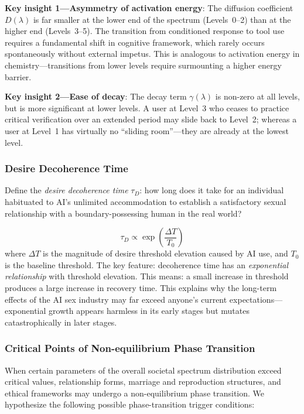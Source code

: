 ﻿\documentclass[12pt,a4paper]{article}
\begin{document}
\textbf{Key insight 1---Asymmetry of activation energy}: The diffusion coefficient $D(\lambda)$ is far smaller at the lower end of the spectrum (Levels~0--2) than at the higher end (Levels~3--5). The transition from conditioned response to tool use requires a fundamental shift in cognitive framework, which rarely occurs spontaneously without external impetus. This is analogous to activation energy in chemistry---transitions from lower levels require surmounting a higher energy barrier.

\textbf{Key insight 2---Ease of decay}: The decay term $\gamma(\lambda)$ is non-zero at all levels, but is more significant at lower levels. A user at Level~3 who ceases to practice critical verification over an extended period may slide back to Level~2; whereas a user at Level~1 has virtually no ``sliding room''---they are already at the lowest level.

\subsubsection{Desire Decoherence Time}

Define the \emph{desire decoherence time} $\tau_D$: how long does it take for an individual habituated to AI's unlimited accommodation to establish a satisfactory sexual relationship with a boundary-possessing human in the real world?

\begin{equation}
\tau_D \propto \exp\left(\frac{\Delta T}{T_0}\right)
\end{equation}
where $\Delta T$ is the magnitude of desire threshold elevation caused by AI use, and $T_0$ is the baseline threshold. The key feature: decoherence time has an \emph{exponential relationship} with threshold elevation. This means: a small increase in threshold produces a large increase in recovery time. This explains why the long-term effects of the AI sex industry may far exceed anyone's current expectations---exponential growth appears harmless in its early stages but mutates catastrophically in later stages.

\subsubsection{Critical Points of Non-equilibrium Phase Transition}

When certain parameters of the overall societal spectrum distribution exceed critical values, relationship forms, marriage and reproduction structures, and ethical frameworks may undergo a non-equilibrium phase transition. We hypothesize the following possible phase-transition trigger conditions:
\end{document}
